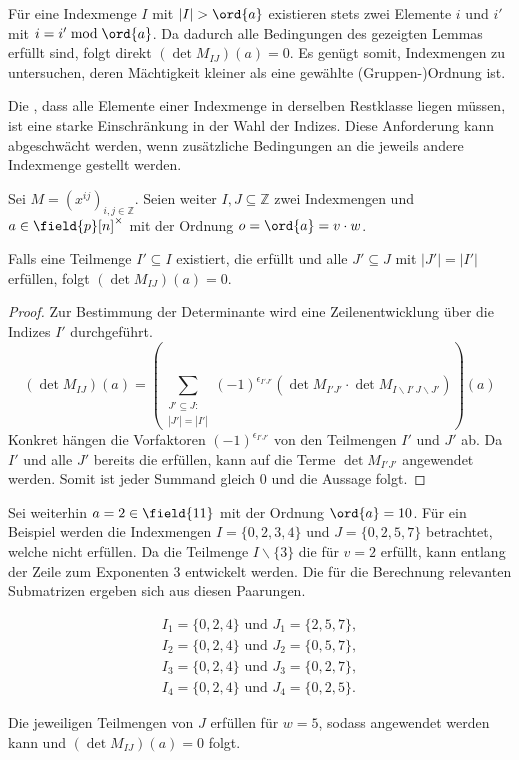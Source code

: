 {Für eine Indexmenge $I$ mit $|I| > \ord{a}$ existieren stets zwei Elemente $i$ und $i'$ mit $i = i' \bmod \ord{a}$. Da dadurch alle Bedingungen des gezeigten Lemmas erfüllt sind, folgt direkt $(\det M_{IJ})(a) = 0$. Es genügt somit, Indexmengen zu untersuchen, deren Mächtigkeit kleiner als eine gewählte (Gruppen-)Ordnung ist.

Die , dass alle Elemente einer Indexmenge in derselben Restklasse liegen müssen, ist eine starke Einschränkung in der Wahl der Indizes. Diese Anforderung kann abgeschwächt werden, wenn zusätzliche Bedingungen an die jeweils andere Indexmenge gestellt werden.

\begin{satz} \label{satz:equal-columns-subs}
    Sei $M = \left( x^{ij} \right)_{i,j \in \mathbb{Z}}$. Seien weiter $I,J \subseteq \mathbb{Z}$ zwei Indexmengen und $a \in \field{p}[n]^\times$ mit der Ordnung $o = \ord{a} = v\cdot w$.

    Falls eine Teilmenge $I' \subseteq I$ existiert, die  erfüllt und alle $J' \subseteq J$ mit $|J'| = |I'|$  erfüllen, folgt $(\det M_{IJ})(a) = 0$.
\end{satz}

\begin{proof}
    Zur Bestimmung der Determinante wird eine Zeilenentwicklung über die Indizes $I'$ durchgeführt. 
\begin{equation*}
    (\det M_{IJ})(a) = \left( \sum_{\substack{J'\subseteq J:\\|J'| = |I'|}} (-1)^{\epsilon_{I'J'}} \left( \det M_{I'J'} \cdot \det M_{I\backslash I'\,J\backslash J'} \right) \right)(a)
\end{equation*}
Konkret hängen die Vorfaktoren $(-1)^{\epsilon_{I'J'}}$ von den Teilmengen $I'$ und $J'$ ab. Da $I'$ und alle $J'$ bereits die  erfüllen, kann  auf die Terme $\det M_{I'J'}$ angewendet werden. Somit ist jeder Summand gleich $0$ und die Aussage folgt.
\end{proof}

Sei weiterhin $a = 2 \in \field{11}$ mit der Ordnung $\ord{a} = 10$. Für ein Beispiel werden die Indexmengen $I = \{0,2,3,4\}$ und $J = \{0,2,5,7\}$ betrachtet, welche  nicht erfüllen. Da die Teilmenge $I\backslash\{3\}$ die  für $v=2$ erfüllt, kann entlang der Zeile zum Exponenten $3$ entwickelt werden. Die für die Berechnung relevanten Submatrizen ergeben sich aus diesen Paarungen.

\begin{align*}
    I_1=\{0,2,4\} \text{ und } J_1=\{2,5,7\}, \\
    I_2=\{0,2,4\} \text{ und } J_2=\{0,5,7\}, \\
    I_3=\{0,2,4\} \text{ und } J_3=\{0,2,7\}, \\
    I_4=\{0,2,4\} \text{ und } J_4=\{0,2,5\}.
\end{align*}

Die jeweiligen Teilmengen von $J$ erfüllen  für $w=5$, sodass  angewendet werden kann und $(\det M_{IJ})(a) = 0$ folgt.
}

\begin{comment}
    Anstatt alle Teilmengen von $J$ einer bestimmten Kardinalität auf die Bedingung zu prüfen, kann auch das minimale $\gamma$ gesucht werden    
\end{comment}